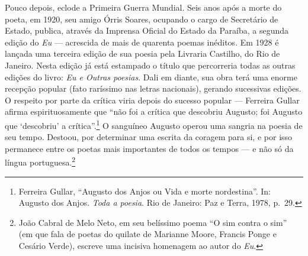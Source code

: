 Pouco depois, eclode a Primeira Guerra Mundial. Seis anos após a
morte do poeta, em 1920, seu amigo Órris Soares, ocupando o cargo de
Secretário de Estado, publica, através da Imprensa Oficial do Estado da
Paraíba, a segunda edição do \textit{Eu} --- acrescida de mais de quarenta
poemas inéditos. Em 1928 é lançada uma terceira edição de sua poesia
pela Livraria Castilho, do Rio de Janeiro. Nesta edição já está
estampado o título que percorreria todas as outras edições do livro:
\textit{Eu e Outras poesias}. Dali em diante, sua obra terá uma enorme
recepção popular (fato raríssimo nas letras nacionais), gerando
sucessivas edições. O respeito por parte da crítica viria depois do
sucesso popular --- Ferreira Gullar afirma espirituosamente que “não foi
a crítica que descobriu Augusto; foi Augusto que ‘descobriu’ a crítica”.\footnote{Ferreira 
Gullar, “Augusto dos Anjos ou Vida e morte
nordestina”. In: Augusto dos Anjos. \textit{Toda a poesia}.
Rio de Janeiro: Paz e Terra, 1978, p.~29.}  O sanguíneo Augusto operou uma sangria na poesia
de seu tempo. Destoou, por determinar uma escrita da coragem para si, e
por isso permanece entre os poetas mais importantes de todos os tempos
--- e não só da língua portuguesa.\footnote{João Cabral de Melo Neto, em seu belíssimo poema “O sim contra o
sim” (em que fala de poetas do quilate de Marianne Moore, Francis Ponge
e Cesário Verde), escreve uma incisiva homenagem ao autor do
\textit{Eu}.} 

%
%
%

